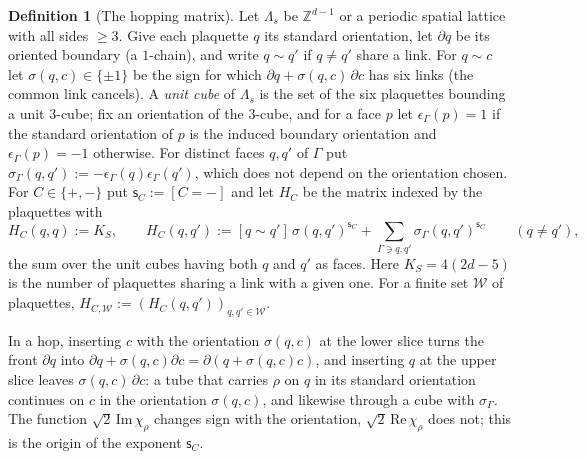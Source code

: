 \documentclass[11pt,a4paper]{article}
\theoremstyle{definition}
\newtheorem{definition}[theorem]{Definition}
\theoremstyle{remark}
\newcommand{\Z}{\mathbb{Z}}
\begin{document}
\begin{definition}[The hopping matrix]\label{mg:def:hopping}
Let $\Lambda_s$ be $\Z^{d-1}$ or a periodic spatial lattice with all sides $\ge3$. Give each plaquette $q$ its standard orientation, let $\partial q$ be its
oriented boundary (a $1$-chain), and write $q\sim q'$ if $q\ne q'$ share a link. For $q\sim c$ let $\sigma(q,c)\in\{\pm1\}$ be the sign for which
$\partial q+\sigma(q,c)\,\partial c$ has six links (the common link cancels). A \emph{unit cube} of $\Lambda_s$ is the set of the six plaquettes bounding a
unit $3$-cube; fix an orientation of the $3$-cube, and for a face $p$ let $\epsilon_\Gamma(p)=1$ if the standard orientation of $p$ is the induced
boundary orientation and $\epsilon_\Gamma(p)=-1$ otherwise. For distinct faces $q,q'$ of $\Gamma$ put $\sigma_\Gamma(q,q'):=-\epsilon_\Gamma(q)\epsilon_\Gamma(q')$, which
does not depend on the orientation chosen. For $C\in\{+,-\}$ put $\mathsf s_C:=[C=-]$ and let $H_C$ be the matrix indexed by the plaquettes with
\[
H_C(q,q):=K_S,\qquad H_C(q,q'):=[q\sim q']\,\sigma(q,q')^{\mathsf s_C}+\sum_{\Gamma\ni q,q'}\sigma_\Gamma(q,q')^{\mathsf s_C}\qquad(q\neq q'),
\]
the sum over the unit cubes having both $q$ and $q'$ as faces. Here $K_S=4(2d-5)$ is the number of plaquettes sharing a link with a given one. For a
finite set $\mathcal W$ of plaquettes, $H_{C,\mathcal W}:=(H_C(q,q'))_{q,q'\in\mathcal W}$.
\end{definition}

In a hop, inserting $c$ with the orientation $\sigma(q,c)$ at the lower slice turns the front $\partial q$ into $\partial q+\sigma(q,c)\partial c=\partial(q+\sigma(q,c)c)$,
and inserting $q$ at the upper slice leaves $\sigma(q,c)\,\partial c$: a tube that carries $\rho$ on $q$ in its standard orientation continues on $c$ in the
orientation $\sigma(q,c)$, and likewise through a cube with $\sigma_\Gamma$. The
function $\sqrt2\,\mathrm{Im}\,\chi_\rho$ changes sign with the orientation, $\sqrt2\,\mathrm{Re}\,\chi_\rho$ does not; this is the origin of the exponent
$\mathsf s_C$.
\end{document}
